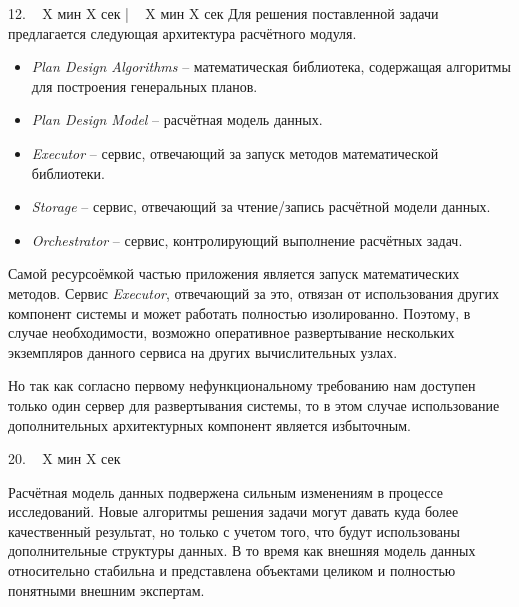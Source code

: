 \documentclass[a4paper,14pt]{extarticle}
\begin{document}
    12. ~ X мин X сек | ~ X мин X сек
    Для решения поставленной задачи предлагается следующая архитектура расчётного модуля.
    \begin{itemize}
        \item \textit{Plan Design Algorithms} -- математическая библиотека, содержащая алгоритмы
        для построения генеральных планов.
        \item \textit{Plan Design Model} -- расчётная модель данных.
        \item \textit{Executor} -- сервис, отвечающий за запуск методов математической библиотеки.
        \item \textit{Storage} -- сервис, отвечающий за чтение/запись расчётной модели данных.
        \item \textit{Orchestrator} -- сервис, контролирующий выполнение расчётных задач.

    \end{itemize}

    Самой ресурсоёмкой частью приложения является запуск математических методов.
    Сервис \textit{Executor}, отвечающий за это, отвязан от использования других компонент системы
    и может работать полностью изолированно.
    Поэтому, в случае необходимости, возможно оперативное развертывание нескольких экземпляров данного сервиса
    на других вычислительных узлах.

    Но так как согласно первому нефункциональному требованию нам доступен только один сервер для развертывания
    системы, то в этом случае использование дополнительных архитектурных компонент является избыточным.

    20. ~ X мин X сек

    Расчётная модель данных подвержена сильным изменениям в процессе исследований.
    Новые алгоритмы решения задачи могут давать куда более качественный результат, но только с учетом того, что
    будут использованы дополнительные структуры данных. В то время как внешняя модель данных относительно стабильна
    и представлена объектами целиком и полностью понятными внешним экспертам.
\end{document}

